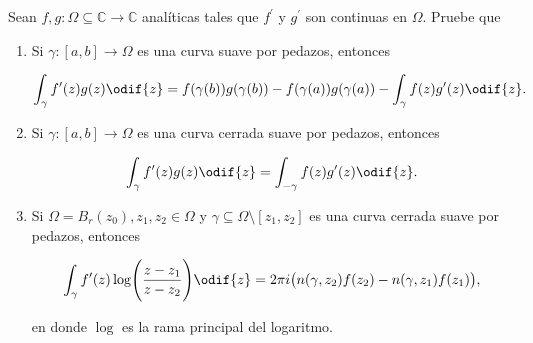 \documentclass[../main.tex]{subfiles}
\begin{document}
\begin{problema}
    Sean \(f,g \colon \Omega \subseteq \mathbb{C} \to \mathbb{C}\) analíticas tales
    que \(f^{\prime}\) y \(g^{\prime}\) son continuas en \(\Omega\). Pruebe que

    \begin{enumerate}
        \item Si \(\gamma \colon [a, b] \to \Omega\) es una curva suave por
            pedazos, entonces

            \begin{equation*}
                \int_{\gamma}^{}f^{\prime}(z)g(z)\odif{z} = f(\gamma(b))g(\gamma(b)) -
                f(\gamma(a))g(\gamma(a)) - \int_{\gamma}^{}f(z)g^{\prime}(z)\odif{z}.
            \end{equation*}

        \item Si \(\gamma \colon [a, b] \to \Omega\) es una curva cerrada suave por
            pedazos, entonces

            \begin{equation*}
                \int_{\gamma}^{}f^{\prime}(z)g(z)\odif{z} =
                \int_{-\gamma}^{}f(z)g^{\prime}(z)\odif{z}.
            \end{equation*}

        \item Si \(\Omega = B_{r}(z_{0}), z_{1}, z_{2}\in \Omega\) y \(\gamma \subseteq
            \Omega\setminus [z_{1}, z_{2}]\) es una curva cerrada suave por
            pedazos, entonces

            \begin{equation*}
                \int_{\gamma}^{}f^{\prime}(z)\log \Biggl(\dfrac{z - z_{1}}{z
                - z_{2}}\Biggr)\odif{z} =
                2\pi i \bigl(n(\gamma, z_{2})f(z_{2}) - n(\gamma, z_{1})f(z_{1})\bigr),
            \end{equation*}

            en donde \(\log\) es la rama principal del logaritmo.
    \end{enumerate}
\end{problema}
\end{document}
